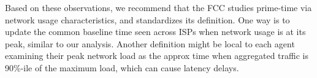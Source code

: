 Based on these observations, we recommend that the FCC studies prime-time via network usage characteristics, and standardizes its definition. One way is to update the common baseline time seen across ISPs when network usage is at its peak, similar to our analysis. Another definition might be local to each agent examining their peak network load as the approx time when aggregated traffic is 90\%-ile of the maximum load, which can cause latency delays. 
